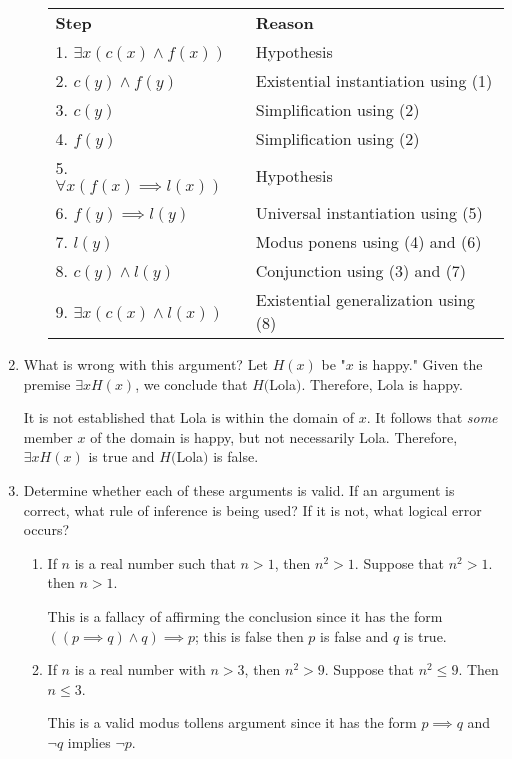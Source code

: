 \documentclass[11pt]{article}
\begin{document}
\begin{enumerate}[label=\textbf{\arabic*.}]
\begin{enumerate}[label=\textbf{\alph*)}]
		\begin{center}
		\begin{tabular}{ll}
			\textbf{Step} & \textbf{Reason} \\
			1. $\exists x(c(x) \land f(x))$ & Hypothesis \\
			2. $c(y) \land f(y)$ & Existential instantiation using (1) \\
			3. $c(y)$ & Simplification using (2) \\
			4. $f(y)$ & Simplification using (2) \\
			5. $\forall x(f(x) \implies l(x))$ & Hypothesis \\
			6. $f(y) \implies l(y)$ & Universal instantiation using (5) \\
			7. $l(y)$ & Modus ponens using (4) and (6) \\
			8. $c(y) \land l(y)$ & Conjunction using (3) and (7) \\
			9. $\exists x(c(x) \land l(x))$ & Existential generalization using (8)
		\end{tabular}
		\end{center}
	\end{enumerate}

	\item What is wrong with this argument? Let $H(x)$ be "$x$ is happy." Given the premise $\exists xH(x)$, we conclude that $H($Lola$)$. Therefore, Lola is happy.
	
	It is not established that Lola is within the domain of $x$. It follows that \emph{some} member $x$ of the domain is happy, but not necessarily Lola. Therefore, $\exists xH(x)$ is true and $H($Lola$)$ is false.
	
	\item Determine whether each of these arguments is valid. If an argument is correct, what rule of inference is being used? If it is not, what logical error occurs?
	\begin{enumerate}[label=\textbf{\alph*)}]
		\item If $n$ is a real number such that $n > 1$, then $n^2 > 1$. Suppose that $n^2 > 1$. then $n > 1$.
		
		This is a fallacy of affirming the conclusion since it has the form $((p \implies q) \land q) \implies p$; this is false then $p$ is false and $q$ is true.
		
		\item If $n$ is a real number with $n > 3$, then $n^2 > 9$. Suppose that $n^2 \leq 9$. Then $n \leq 3$.
		
		This is a valid modus tollens argument since it has the form $p \implies q$ and $\neg q$ implies $\neg p$.
		

\end{enumerate}
\end{enumerate}
\end{document}
